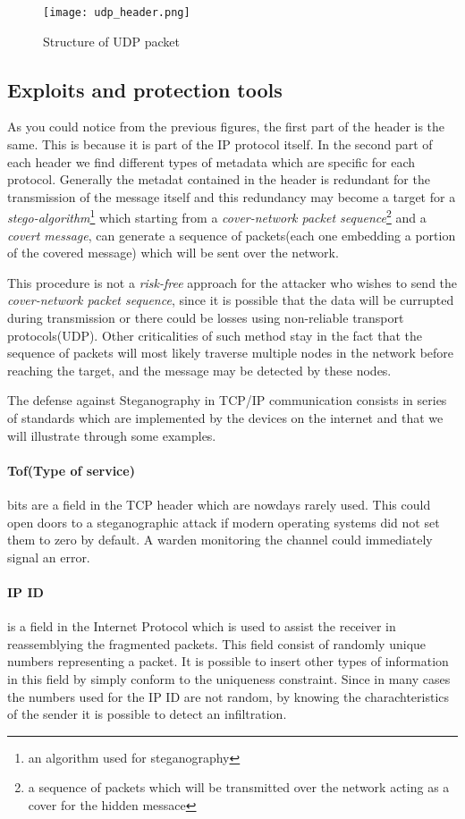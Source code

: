 \documentclass[../../main.tex]{subfiles}
\begin{document}
\begin{figure}[h]
    \centering
    \caption{Structure of UDP packet}
    \texttt{[image: udp\_header.png]}
\end{figure}


\subsection{Exploits and protection tools}

As you could notice from the previous figures, the first part of the header
is the same. This is because it is part of the IP protocol itself.
In the second part of each header we find different types of metadata which
are specific for each protocol. Generally the metadat contained in the
header is redundant for the transmission of the message itself and this 
redundancy may become a target for a \emph{stego-algorithm}\footnote{an
algorithm used for steganography} which starting from a \emph{cover-network
packet sequence}\footnote{a sequence of packets which will be transmitted
over the network acting as a cover for the hidden messace} and a
\emph{covert message}, can generate a sequence of packets(each one embedding
a portion of the covered message) which will be sent over the network.

This procedure is not a \emph{risk-free} approach for the attacker who
wishes to send the \emph{cover-network packet sequence}, since it is
possible that the data will be currupted during transmission or there could
be losses using non-reliable transport protocols(UDP).
Other criticalities of such method stay in the fact that the sequence of
packets will most likely traverse multiple nodes in the network before
reaching the target, and the message may be detected by these nodes.

The defense against Steganography in TCP/IP communication consists in 
series of standards which are implemented by the devices on the internet and
that we will illustrate through some examples.


\paragraph{Tof(Type of service)} bits are a field in the TCP header which
are nowdays rarely used. This could open doors to a steganographic attack if
modern operating systems did not set them to zero by default.
A warden monitoring the channel could immediately signal an error.

\paragraph{IP ID} is a field in the Internet Protocol which is used to
assist the receiver in reassemblying the fragmented packets.
This field consist of randomly unique numbers representing a packet.
It is possible to insert other types of information in this field by simply
conform to the uniqueness constraint.
Since in many cases the numbers used for the IP ID are not random, by
knowing the charachteristics of the sender it is possible to detect an
infiltration.
\end{document}
